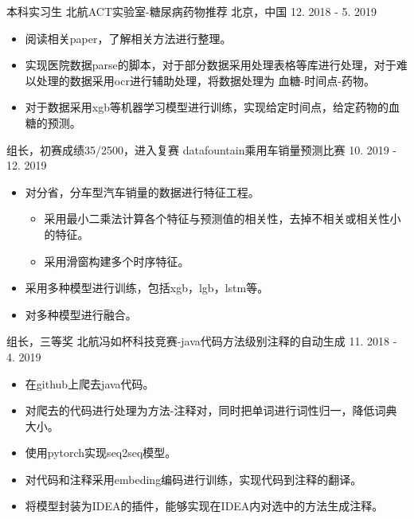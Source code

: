 \begin{cventries}
  \cventry
    {本科实习生}
    {北航ACT实验室-糖尿病药物推荐}
    {北京，中国}
    {12. 2018 - 5. 2019}
    {
      \begin{itemize}
        \item {阅读相关paper，了解相关方法进行整理。}
        \item {实现医院数据parse的脚本，对于部分数据采用处理表格等库进行处理，对于难以处理的数据采用ocr进行辅助处理，将数据处理为 血糖-时间点-药物。}
        \item {对于数据采用xgb等机器学习模型进行训练，实现给定时间点，给定药物的血糖的预测。}
      \end{itemize}
    }

  \cventry
    {组长，初赛成绩35/2500，进入复赛}
    {datafountain乘用车销量预测比赛}
    {}
    {10. 2019 - 12. 2019}
    {
      \begin{itemize}
        \item {对分省，分车型汽车销量的数据进行特征工程。}
          \begin{itemize}
            \item {采用最小二乘法计算各个特征与预测值的相关性，去掉不相关或相关性小的特征。}
            \item {采用滑窗构建多个时序特征。}
          \end{itemize}
        \item {采用多种模型进行训练，包括xgb，lgb，lstm等。}
        \item {对多种模型进行融合。}
      \end{itemize}
    }

  \cventry
    {组长，三等奖}
    {北航冯如杯科技竞赛-java代码方法级别注释的自动生成}
    {}
    {11. 2018 - 4. 2019}
    {
      \begin{itemize}
        \item {在github上爬去java代码。}
        \item {对爬去的代码进行处理为方法-注释对，同时把单词进行词性归一，降低词典大小。}
        \item {使用pytorch实现seq2seq模型。}
        \item {对代码和注释采用embeding编码进行训练，实现代码到注释的翻译。}
        \item {将模型封装为IDEA的插件，能够实现在IDEA内对选中的方法生成注释。}
      \end{itemize}
    }


\end{cventries}
